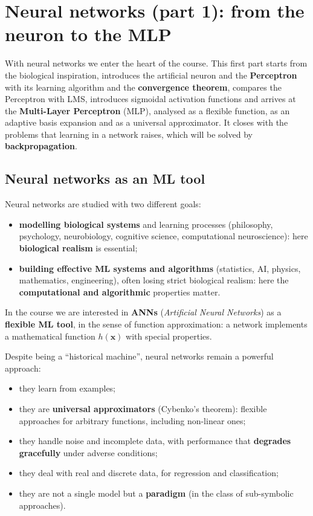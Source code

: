 \chapter{Neural networks (part 1): from the neuron to the MLP}\label{ch-06}

With neural networks we enter the heart of the course. This first part
starts from the biological inspiration, introduces the artificial
neuron and the \textbf{Perceptron} with its learning algorithm and the
\textbf{convergence theorem}, compares the Perceptron with LMS,
introduces sigmoidal activation functions and arrives at the
\textbf{Multi-Layer Perceptron} (MLP), analysed as a flexible function,
as an adaptive basis expansion and as a universal approximator. It
closes with the problems that learning in a network raises, which will
be solved by \textbf{backpropagation}.

\section{Neural networks as an ML
tool}\label{le-reti-neurali-come-strumento-di-ml}

Neural networks are studied with two different goals:

\begin{itemize}
\tightlist
\item
  \textbf{modelling biological systems} and learning processes
  (philosophy, psychology, neurobiology, cognitive science,
  computational neuroscience): here \textbf{biological realism} is
  essential;
\item
  \textbf{building effective ML systems and algorithms} (statistics,
  AI, physics, mathematics, engineering), often losing strict
  biological realism: here the \textbf{computational and algorithmic}
  properties matter.
\end{itemize}

In the course we are interested in \textbf{ANNs} (\emph{Artificial
Neural Networks}) as a \textbf{flexible ML tool}, in the sense of
function approximation: a network implements a mathematical function
\(h(\mathbf{x})\) with special properties.

Despite being a ``historical machine'', neural networks remain a
powerful approach:

\begin{itemize}
\tightlist
\item
  they learn from examples;
\item
  they are \textbf{universal approximators} (Cybenko's theorem):
  flexible approaches for arbitrary functions, including non-linear
  ones;
\item
  they handle noise and incomplete data, with performance that
  \textbf{degrades gracefully} under adverse conditions;
\item
  they deal with real and discrete data, for regression and
  classification;
\item
  they are not a single model but a \textbf{paradigm} (in the class of
  sub-symbolic approaches).
\end{itemize}

